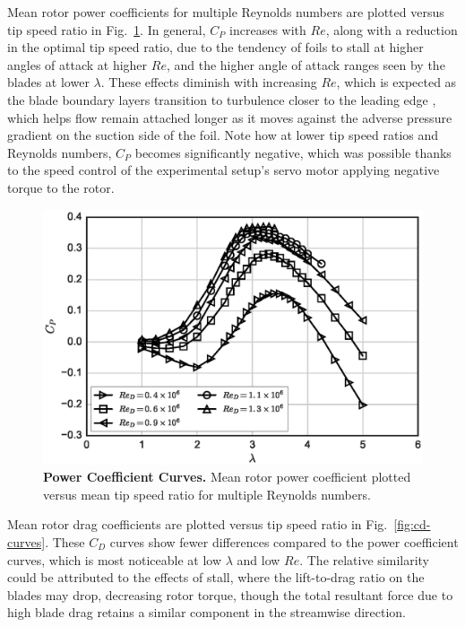 \documentclass[10pt,letterpaper]{article}
\begin{document}
Mean rotor power coefficients for multiple Reynolds numbers are plotted versus
tip speed ratio in Fig.~\ref{fig:cp-curves}. In general, $C_P$ increases with
$Re$, along with a reduction in the optimal tip speed ratio, due to the tendency
of foils to stall at higher angles of attack at higher $Re$, and the higher
angle of attack ranges seen by the blades at lower $\lambda$. These effects
diminish with increasing $Re$, which is expected as the blade boundary layers
transition to turbulence closer to the leading edge \cite{Lissaman1983,
    McMasters1980, Bachant2015-RVAT-Re-dep}, which helps flow remain attached longer
as it moves against the adverse pressure gradient on the suction side of the
foil. Note how at lower tip speed ratios and Reynolds numbers, $C_P$ becomes
significantly negative, which was possible thanks to the speed control of the
experimental setup's servo motor applying negative torque to the rotor.

\begin{figure}[h]
    \includegraphics[width=\textwidth]{figures/cp_curves.eps}

    \caption{{\bf Power Coefficient Curves.} Mean rotor power coefficient
    plotted versus mean tip speed ratio for multiple Reynolds numbers.}

    \label{fig:cp-curves}
\end{figure}

Mean rotor drag coefficients are plotted versus tip speed ratio in
Fig.~\ref{fig:cd-curves}. These $C_D$ curves show fewer differences compared to
the power coefficient curves, which is most noticeable at low $\lambda$ and low
$Re$. The relative similarity could be attributed to the effects of stall, where
the lift-to-drag ratio on the blades may drop, decreasing rotor torque, though
the total resultant force due to high blade drag retains a similar component in
the streamwise direction.
\end{document}
